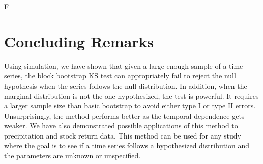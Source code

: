 \documentclass[12pt, letterpaper]{article}
\begin{document}


F

\section{Concluding Remarks}
\label{sec:conclusion}

Using simulation, we have shown that given a large enough sample of a time 
series, the block 
bootstrap KS test can appropriately fail to reject the null hypothesis when the
series follows the null distribution. In addition, when the marginal
distribution is not
the one hypothesized, the test is powerful. It requires a larger sample size 
than basic bootstrap to avoid either type I or type II errors. Unsurprisingly,
the method performs better as the temporal dependence gets weaker. We have also 
demonstrated possible applications of this method to precipitation and 
stock return data. This method can be used for any study where the goal is
to see if a time series follows a hypothesized distribution and the parameters
are unknown or unspecified. 







\end{document}

